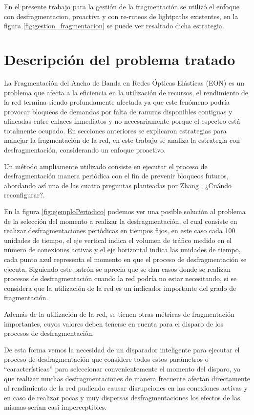 En el presente trabajo para la gestión de la fragmentación se utilizó el enfoque con desfragmentacion, proactiva y con re-ruteos de lightpaths existentes, en la figura \ref{fig:gestion_fragmentacion} se puede ver resaltado dicha estrategia.

\section{Descripción del problema tratado}
La Fragmentación del Ancho de Banda en Redes Ópticas Elásticas (EON) es un problema que afecta a la eficiencia en la utilización de recursos, el rendimiento de la red termina siendo profundamente afectada ya que este fenómeno podría provocar bloqueos de demandas por falta de ranuras disponibles contiguas y alineadas entre enlaces inmediatos y no necesariamente porque el espectro está totalmente ocupado. En secciones anteriores se explicaron estrategias para manejar la fragmentación de la red, en este trabajo se analiza la estrategia con desfragmentación, considerando un enfoque proactivo.

Un método ampliamente utilizado consiste en ejecutar el proceso de desfragmentación manera periódica con el fin de prevenir bloqueos futuros, abordando así una de las cuatro preguntas planteadas por Zhang \cite{zhang2014dynamic}, ¿Cuándo reconfigurar?.

En la figura \ref{fig:ejemploPeriodico} podemos ver una posible solución al problema de la selección del momento a realizar la desfragmentación, el cual consiste en realizar desfragmentaciones periódicas en tiempos fijos, en este caso cada 100 unidades de tiempo, el eje vertical indica el volumen de tráfico medido en el número de conexiones activas y el eje horizontal indica las unidades de tiempo, cada punto azul representa el momento en que el proceso de desfragmentación se ejecuta. Siguiendo este patrón se aprecia que se dan casos donde se realizan procesos de desfragmentación cuando la red podría no estar necesitando, si se considera que la utilización de la red es un indicador importante del grado de fragmentación. 

Además de la utilización de la red, se tienen otras métricas de fragmentación importantes, cuyos valores deben tenerse en cuenta para el disparo de los procesos de desfragmentación.

De esta forma vemos la necesidad de un disparador inteligente para ejecutar el proceso de desfragmentación que considere todos estos parámetros o ``características'' para seleccionar convenientemente el momento del disparo, ya que realizar muchas desfragmentaciones de manera frecuente afectan directamente al rendimiento de la red pudiendo causar disrupciones en las conexiones activas y en caso de realizar pocas y muy dispersas desfragmentaciones los efectos de las mismas serían casi imperceptibles.

